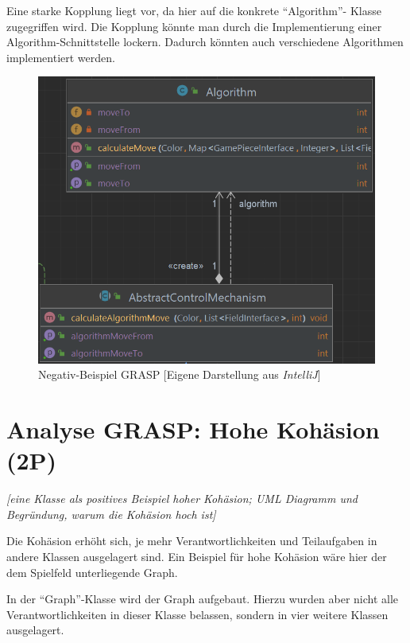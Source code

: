 Eine starke Kopplung liegt vor, da hier auf die konkrete \enquote{Algorithm}- Klasse zuge\-griffen wird. Die Kopplung könnte man durch die Implementierung einer Algorithm-Schnittstelle lockern. Dadurch könnten auch verschiedene Algorithmen implementiert werden.

\begin{figure}[htbp]
\centering
\centerline{\includegraphics[scale=.6]{grasp2}}
\caption{Negativ-Beispiel GRASP [Eigene Darstellung aus \emph{IntelliJ}]}
\label{fig:grasp2}
\end{figure}

\newpage
\section{Analyse GRASP: Hohe Kohäsion (2P)}
\emph{[eine Klasse als positives Beispiel hoher Kohäsion; UML Diagramm und Begründung, warum die
Kohäsion hoch ist]}

\noindent Die Kohäsion erhöht sich, je mehr Verantwortlichkeiten und Teilaufgaben in andere Klassen ausgelagert sind. Ein Beispiel für hohe Kohäsion wäre hier der dem Spielfeld unterliegende Graph.


\noindent In der \enquote{Graph}-Klasse wird der Graph aufgebaut. Hierzu wurden aber nicht alle Verantwortlichkeiten in dieser Klasse belassen, sondern in vier weitere Klassen ausgelagert.

